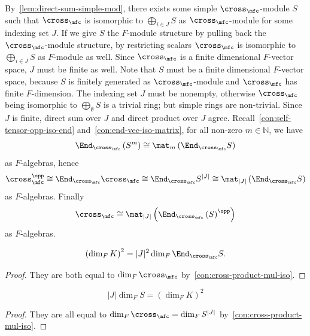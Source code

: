 \begin{construction}\label{con:cross-product-mul-iso}
  By~\cref{lem:direct-sum-simple-mod}, there exists some simple $\cross_{\mfc}$-module $S$ such that $\cross_{\mfc}$ is isomorphic to $\bigoplus_{i\in J}S$ as $\cross_{\mfc}$-module for some indexing set $J$. If we give $S$ the $F$-module structure by pulling back the $\cross_{\mfc}$-module structure, by restricting scalars $\cross_{\mfc}$ is isomorphic to $\bigoplus_{i\in J} S$ as $F$-module as well. Since $\cross_{\mfc}$ is a finite dimensional $F$-vector space, $J$ must be finite as well. Note that $S$ must be a finite dimensional $F$-vector space, because $S$ is finitely generated as $\cross_{\mfc}$-module and $\cross_{\mfc}$ has finite $F$-dimension.
  The indexing set $J$ must be nonempty, otherwise $\cross_{\mfc}$ being isomorphic to $\bigoplus_{\emptyset} S$ is a trivial ring; but simple rings are non-trivial. Since $J$ is finite, direct sum over $J$ and direct product over $J$ agree.
  Recall~\cref{con:self-tensor-opp-iso-end} and~\cref{con:end-vec-iso-matrix}, for all non-zero $m \in\mathbb{N}$, we have
  \[
    \End_{\cross_{\mfc}}\left(S^{m}\right) \cong \mat_{m}\left(\End_{\cross_{\mfc}}S\right)
  \]
  as $F$-algebras, hence
  \[
    \cross_{\mfc}^{\opp} \cong \End_{\cross_{\mfc}}\cross_{\mfc}\cong \End_{\cross_{\mfc}}S^{|J|} \cong \mat_{|J|}\left(\End_{\cross_{\mfc}}S\right)
  \]
  as $F$-algebras.
  Finally
  \[
    \cross_{\mfc}\cong \mat_{|J|}\left(\End_{\cross_{\mfc}}\left(S\right)^{\opp}\right)
  \]
  as $F$-algebras.
  \leanok
\end{construction}

\begin{corollary}\label{cor:dim-eq-1}
  \[
    \left(\dim_{F}K\right)^{2} = |J|^{2}\dim_{F}\End_{\cross_{\mfc}}S.
  \]
  \leanok
\end{corollary}
\begin{proof}
  They are both equal to $\dim_{F}\cross_{\mfc}$ by~\cref{con:cross-product-mul-iso}.
\end{proof}

\begin{corollary}\label{cor:dim-eq-2}
  \[
    |J|\dim_{F}S = \left(\dim_{F}K\right)^{2}
  \]
  \leanok
\end{corollary}
\begin{proof}
  They are all equal to $\dim_{F}\cross_{\mfc} = \dim_{F}S^{|J|}$ by~\cref{con:cross-product-mul-iso}.
\end{proof}

